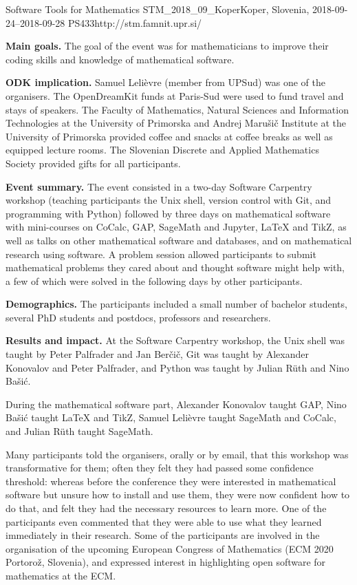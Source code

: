 \begin{event}{Software Tools for Mathematics}%
{STM_2018_09_Koper}{Koper, Slovenia, 2018-09-24--2018-09-28}%
{PS}{43}{3}{http://stm.famnit.upr.si/}

\textbf{Main goals.} The goal of the event was for mathematicians
to improve their coding skills and knowledge of mathematical software.

\textbf{ODK implication.} Samuel Lelièvre (\ODK member from UPSud) was one of
the organisers. The OpenDreamKit funds at Paris-Sud were used to fund travel
and stays of speakers.
The Faculty of Mathematics, Natural Sciences and Information Technologies at the University of Primorska
and Andrej Marušič Institute at the University of Primorska 
provided coffee and snacks at coffee breaks as well as equipped lecture rooms. 
The Slovenian Discrete and Applied Mathematics Society provided gifts for all participants.

\textbf{Event summary.} The event consisted in a two-day Software Carpentry
workshop (teaching participants the Unix shell, version control with Git,
and programming with Python) followed by three days on mathematical software
with mini-courses on CoCalc, GAP, SageMath and Jupyter, LaTeX and TikZ, as well
as talks on other mathematical software and databases, and on mathematical
research using software. A problem session allowed participants to submit
mathematical problems they cared about and thought software might help with,
a few of which were solved in the following days by other participants.

\textbf{Demographics.} The participants included a small number of bachelor
students, several PhD students and postdocs, professors and
researchers.

\textbf{Results and impact.} At the Software Carpentry workshop, 
the Unix shell was taught by Peter Palfrader and Jan Ber\v{c}i\v{c}, 
Git was taught by Alexander Konovalov and Peter Palfrader,
and Python was taught by Julian R\"{u}th and Nino Ba\v{s}i\'{c}.

During the mathematical software part,
Alexander Konovalov taught GAP,
Nino Ba\v{s}i\'{c} taught LaTeX and TikZ,
Samuel Leli\`{e}vre taught SageMath and CoCalc,
and Julian R\"{u}th taught SageMath.

Many participants told the organisers, orally or by email, that this workshop
was transformative for them; often they felt they had passed some confidence
threshold: whereas before the conference they were interested in mathematical
software but unsure how to install and use them, they were now confident how
to do that, and felt they had the necessary resources to learn more.
One of the participants even commented that they were able to use what they learned
immediately in their research.
Some of the participants are involved in the organisation of the upcoming 
European Congress of Mathematics (ECM 2020 Portoro\v{z}, Slovenia),
and expressed interest in highlighting open software for mathematics at the ECM.


\end{event}

